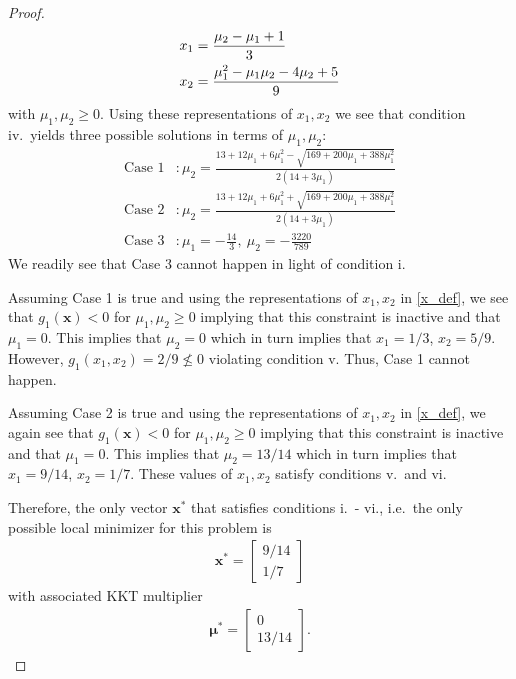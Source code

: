 \documentclass[12pt]{article}
\theoremstyle{definition}
\newcommand{\vc}[1]{\boldsymbol{#1}}
\begin{document}
\begin{proof}
\begin{align}
    x_1 &= \frac{\mu_2-\mu_1+1}{3} \notag\\
    x_2 &=\frac{\mu_1^2-\mu_1\mu_2-4\mu_2+5}{9}
  \end{align}
  with $\mu_1, \mu_2\geq 0$. Using these representations of $x_1, x_2$ we see that condition iv.\
  yields three possible solutions in terms of $\mu_1, \mu_2$:
  \begin{align*}
    \text{Case 1}&: \mu_2 = \frac{13 + 12 \mu_1 + 6 \mu_1^2 - \sqrt{169 + 200 \mu_1 + 388 \mu_1^2}}{2 (14 + 3 \mu_1)}\\
    \text{Case 2}&: \mu_2 = \frac{13 + 12 \mu_1 + 6 \mu_1^2 + \sqrt{169 + 200 \mu_1 + 388 \mu_1^2}}{2 (14 + 3 \mu_1)}\\
    \text{Case 3}&: \mu_1 = -\frac{14}{3},\ \mu_2 = -\frac{3220}{789}
  \end{align*}
  We readily see that Case 3 cannot happen in light of condition i.

  Assuming Case 1 is true and using the representations of $x_1, x_2$ in \eqref{x_def},
  we see that $g_1(\vc{x}) < 0$ for $\mu_1, \mu_2 \geq 0$ implying that this constraint is inactive and that $\mu_1 = 0$.
  This implies that $\mu_2 = 0$ which in turn implies that $x_1 = 1/3$, $x_2 =  5/9$.
  However, $g_1(x_1,x_2) = 2/9 \nleq 0$ violating condition v. Thus, Case 1 cannot happen.

  Assuming Case 2 is true and using the representations of $x_1, x_2$ in \eqref{x_def},
  we again see that $g_1(\vc{x}) < 0$ for $\mu_1, \mu_2 \geq 0$ implying that this constraint is inactive and that $\mu_1 = 0$.
  This implies that $\mu_2 = 13/14$ which in turn implies that $x_1 = 9/14$, $x_2 =  1/7$.
  These values of $x_1, x_2$ satisfy conditions v.\ and vi.

  Therefore, the only vector $\vc{x}^*$ that satisfies conditions
  i.\ - vi., i.e.\ the only possible local minimizer for this problem is
  \begin{align*}
    \vc{x}^* = \begin{bmatrix}9/14 \\ 1/7\end{bmatrix}
  \end{align*}
  with associated KKT multiplier
  \begin{align*}
    \vc{\mu}^* = \begin{bmatrix}0 \\ 13/14\end{bmatrix}.
  \end{align*}


\end{proof}
\end{document}
